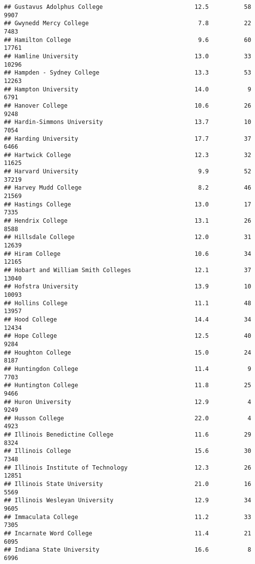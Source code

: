 \documentclass[
]{article}
\begin{document}
\begin{verbatim}
## Gustavus Adolphus College                          12.5          58   9907
## Gwynedd Mercy College                               7.8          22   7483
## Hamilton College                                    9.6          60  17761
## Hamline University                                 13.0          33  10296
## Hampden - Sydney College                           13.3          53  12263
## Hampton University                                 14.0           9   6791
## Hanover College                                    10.6          26   9248
## Hardin-Simmons University                          13.7          10   7054
## Harding University                                 17.7          37   6466
## Hartwick College                                   12.3          32  11625
## Harvard University                                  9.9          52  37219
## Harvey Mudd College                                 8.2          46  21569
## Hastings College                                   13.0          17   7335
## Hendrix College                                    13.1          26   8588
## Hillsdale College                                  12.0          31  12639
## Hiram College                                      10.6          34  12165
## Hobart and William Smith Colleges                  12.1          37  13040
## Hofstra University                                 13.9          10  10093
## Hollins College                                    11.1          48  13957
## Hood College                                       14.4          34  12434
## Hope College                                       12.5          40   9284
## Houghton College                                   15.0          24   8187
## Huntingdon College                                 11.4           9   7703
## Huntington College                                 11.8          25   9466
## Huron University                                   12.9           4   9249
## Husson College                                     22.0           4   4923
## Illinois Benedictine College                       11.6          29   8324
## Illinois College                                   15.6          30   7348
## Illinois Institute of Technology                   12.3          26  12851
## Illinois State University                          21.0          16   5569
## Illinois Wesleyan University                       12.9          34   9605
## Immaculata College                                 11.2          33   7305
## Incarnate Word College                             11.4          21   6095
## Indiana State University                           16.6           8   6996

\end{verbatim}
\end{document}
